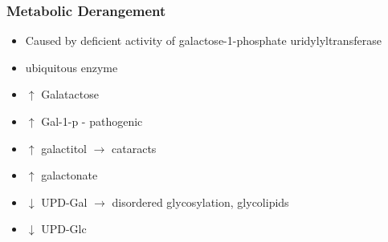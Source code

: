 \documentclass{scrartcl}
\begin{document}
\subsubsection{Metabolic Derangement}
\label{sec:orgce0a436}
\begin{itemize}
\item Caused by deficient activity of galactose-1-phosphate uridylyltransferase
\item ubiquitous enzyme
\item \(\uparrow\)  Galatactose
\item \(\uparrow\) Gal-1-p - pathogenic
\item \(\uparrow\)  galactitol \(\to\) cataracts
\item \(\uparrow\) galactonate
\item \(\downarrow\) UPD-Gal \(\to\) disordered glycosylation, glycolipids
\item \(\downarrow\) UPD-Glc
\end{itemize}
\end{document}
